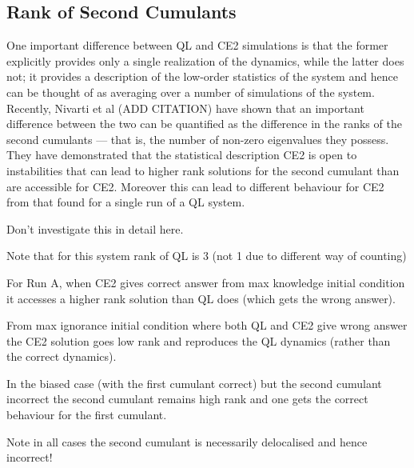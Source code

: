 \documentclass{jfm}
\newcommand{\cu}{c_u}
\begin{document}

%
\subsection{Rank of Second Cumulants}
\label{sec:rank}
One important difference between QL and CE2 simulations is that the former explicitly provides only a single realization of the dynamics, while the latter does not; it provides a description of the low-order statistics of the system and hence can be thought of as averaging over a number of simulations of the system. 
Recently, Nivarti et al (ADD CITATION) have shown that an important difference between the two can be quantified as the difference in the ranks of the second cumulants --- that is, the number of non-zero eigenvalues they possess. They have demonstrated that the statistical description CE2 is open to instabilities that can lead to higher rank solutions for the second cumulant than are accessible for CE2. Moreover this can lead to different behaviour for CE2 from that found for a single run of a QL system.

Don't investigate this in detail here.

Note that for this system rank of QL is 3 (not 1 due to different way of counting)

For Run A, when CE2 gives correct answer from max knowledge initial condition it accesses a higher rank solution than QL does (which gets the wrong answer). 

From max ignorance initial condition where both QL and CE2 give wrong answer the CE2 solution goes low rank and reproduces the QL dynamics (rather than the correct dynamics).

In the biased case (with the first cumulant correct) but the second cumulant incorrect the second cumulant remains high rank and one gets the correct behaviour for the first cumulant.

Note in all cases the second cumulant is necessarily delocalised and hence incorrect!
\end{document}

